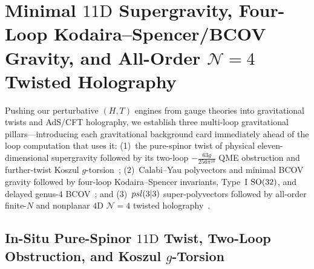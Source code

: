 \section{Minimal \texorpdfstring{$11\mathrm{D}$}{11D} Supergravity, Four-Loop Kodaira--Spencer/BCOV Gravity, and All-Order \texorpdfstring{$\mathcal{N}=4$}{N=4} Twisted Holography}
\label{sec:sugra-bcov-holo}

Pushing our perturbative $(H,T)$ engines from gauge theories into gravitational twists and AdS/CFT holography, we establish three multi-loop gravitational pillars---introducing each gravitational background card immediately ahead of the loop computation that uses it: (1)~the pure-spinor twist of physical eleven-dimensional supergravity followed by its two-loop $-\frac{63g}{256\pi^{10}}$ QME obstruction and further-twist Koszul $g$-torsion~\cite{CJS78,Cederwall10,RSW21,HPR25,Repo9e833c8}; (2)~Calabi--Yau polyvectors and minimal BCOV gravity followed by four-loop Kodaira--Spencer invariants, Type~I $\operatorname{SO}(32)$, and delayed genus-$4$ BCOV~\cite{BCOV94,CL19,LW26,Repo9e833c8}; and (3)~$psl(3|3)$ super-polyvectors followed by all-order finite-$N$ and nonplanar $4\mathrm{D}$ $\mathcal{N}=4$ twisted holography~\cite{CG18,SW,FPW24,BG26,Repo9e833c8}.

\subsection{In-Situ Pure-Spinor \texorpdfstring{$11\mathrm{D}$}{11D} Twist, Two-Loop Obstruction, and Koszul \texorpdfstring{$g$}{g}-Torsion}
\label{subsec:11d-two-loop}
\label{subsec:11d-pure-spinor}

